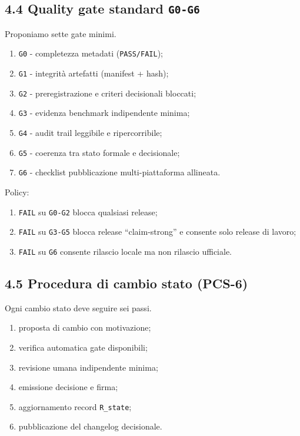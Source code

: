 \subsection{\texorpdfstring{4.4 Quality gate standard \texttt{G0-G6}}{4.4 Quality gate standard G0-G6}}

Proponiamo sette gate minimi.

\begin{enumerate}
\def\labelenumi{\arabic{enumi}.}
\tightlist
\item
  \texttt{G0} - completezza metadati (\texttt{PASS/FAIL});
\item
  \texttt{G1} - integrità artefatti (manifest + hash);
\item
  \texttt{G2} - preregistrazione e criteri decisionali bloccati;
\item
  \texttt{G3} - evidenza benchmark indipendente minima;
\item
  \texttt{G4} - audit trail leggibile e ripercorribile;
\item
  \texttt{G5} - coerenza tra stato formale e decisionale;
\item
  \texttt{G6} - checklist pubblicazione multi-piattaforma allineata.
\end{enumerate}

Policy:

\begin{enumerate}
\def\labelenumi{\arabic{enumi}.}
\tightlist
\item
  \texttt{FAIL} su \texttt{G0-G2} blocca qualsiasi release;
\item
  \texttt{FAIL} su \texttt{G3-G5} blocca release ``claim-strong'' e consente solo release di lavoro;
\item
  \texttt{FAIL} su \texttt{G6} consente rilascio locale ma non rilascio ufficiale.
\end{enumerate}

\subsection{4.5 Procedura di cambio stato (PCS-6)}

Ogni cambio stato deve seguire sei passi.

\begin{enumerate}
\def\labelenumi{\arabic{enumi}.}
\tightlist
\item
  proposta di cambio con motivazione;
\item
  verifica automatica gate disponibili;
\item
  revisione umana indipendente minima;
\item
  emissione decisione e firma;
\item
  aggiornamento record \texttt{R\_state};
\item
  pubblicazione del changelog decisionale.
\end{enumerate}

